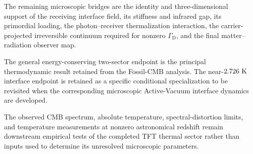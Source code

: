The remaining microscopic bridges are the identity and three-dimensional
support of the receiving interface field, its stiffness and infrared gap, its
primordial loading, the photon--receiver thermalization interaction, the
carrier-projected irreversible continuum required for nonzero
\(\Gamma_{\mathrm D}\), and the final matter--radiation observer map.

The general energy-conserving two-sector endpoint is the principal
thermodynamic result retained from the Fossil-CMB analysis. The
near-\(2.726~{\rm K}\) interface endpoint is retained as a specific conditional
specialization to be revisited when the corresponding microscopic
Active-Vacuum interface dynamics are developed.

The observed CMB spectrum, absolute temperature, spectral-distortion limits,
and temperature measurements at nonzero astronomical redshift remain
downstream empirical tests of the completed TFT thermal sector rather than
inputs used to determine its unresolved microscopic parameters.